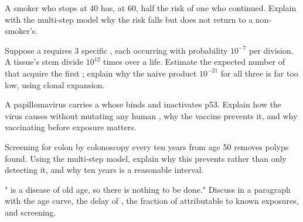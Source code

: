 \begin{exercise}[$\star\star$]\label{exo:g11:cancer:11}
A smoker who stops at 40 has, at 60, half the  risk of one
who continued. Explain with the multi-step model why the risk falls
but does not return to a non-smoker's.
\end{exercise}

\begin{exercise}[$\star\star\star$]\label{exo:g11:cancer:12}
Suppose a  requires 3 specific , each occurring with
probability $10^{-7}$ per  division. A tissue's stem  divide
$10^{12}$ times over a life. Estimate the expected number of 
that acquire the first ; explain why the naive product
$10^{-21}$ for all three is far too low, using clonal expansion.
\end{exercise}

\begin{exercise}[$\star\star\star$]\label{exo:g11:cancer:13}
A papillomavirus carries a  whose  binds and inactivates
p53. Explain how the virus causes  without mutating any human
, why the vaccine prevents it, and why vaccinating before
exposure matters.
\end{exercise}

\begin{exercise}[$\star\star\star$]\label{exo:g11:cancer:14}
Screening for colon  by colonoscopy every ten years from age 50
removes polyps found. Using the multi-step model, explain why this
prevents  rather than only detecting it, and why ten years is a
reasonable interval.
\end{exercise}

\begin{exercise}[$\star\star\star$]\label{exo:g11:cancer:15}
" is a disease of old age, so there is nothing to be done."
Discuss in a paragraph with the age curve, the delay of ,
the fraction of  attributable to known exposures, and
screening.
\end{exercise}

